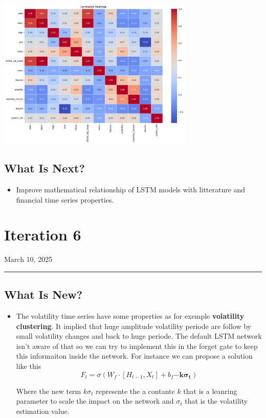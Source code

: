 \documentclass[letterpaper,11pt]{article}
\begin{document}
\begin{center}
  \includegraphics[width=0.7\textwidth]{img/corr_matrixS.png}
  \end{center}

\subsection*{What Is Next?}
\begin{itemize} 
  \item Improve mathematical relationship of LSTM models with litterature and financial time series properties.
 
\end{itemize}







\newpage
\section*{Iteration 6}
\begin{flushright}
March 10, 2025
\end{flushright}
\hrule
\vspace{0.2in}
\subsection*{What Is New?}
\begin{itemize}
  \item The volatility time series have some properties as for exemple \textbf{volatility clustering}. It implied that huge amplitude volatility periode are follow by small volatility changes and back to huge periode. The default LSTM network isn't aware of that so we can try to implement this in the forget gate to keep this informaiton inside the network.
  For instance we can propose a solution like this
  \[
  F_t = \sigma \left( W_f \cdot [H_{t-1}, X_t] + b_f \mathbf{- k \sigma_t} \right)
  \]

Where the new term $ k \sigma_t$ represente the a contante $k$ that is a leanring parameter to scale the impact on the network
and $\sigma_t$ that is the volatility estimation value.

\end{itemize}
\end{document}
